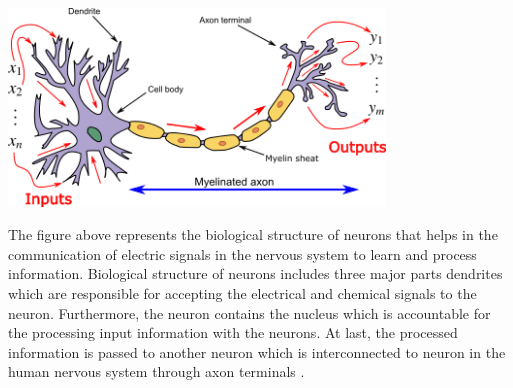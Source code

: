 \vspace{3mm}
\begin{center}
\includegraphics[width=10cm]{Images/neuron.png}
\end{center}

The figure above represents the biological structure of neurons that helps in the communication of electric signals in the 
nervous system to learn and process information. Biological structure of neurons
includes three major parts dendrites which are responsible for accepting the electrical and chemical signals to the neuron. 
Furthermore, the neuron contains the nucleus which is accountable for the processing input information with the neurons. 
At last, the processed information is passed to another neuron which is interconnected to 
neuron in the human nervous system through axon terminals
\citep{AGATONOVICKUSTRIN2000717}. 

